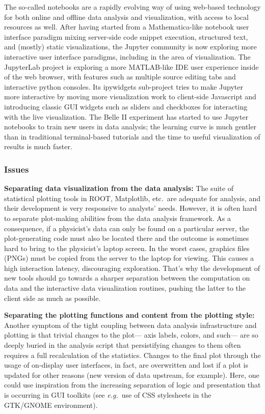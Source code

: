 \documentclass[12pt,a4paper]{article}
\begin{document}
The so-called notebooks are a rapidly evolving way of using web-based technology for both online and offline data analysis and
visualization, with access to local resources as well. After having started from a Mathematica-like notebook user interface
paradigm mixing server-side code snippet execution, structured text, and (mostly) static visualizations, the Jupyter community
is now exploring more interactive user interface paradigms, including in the area of visualization. The JupyterLab project is
exploring a more MATLAB-like IDE user experience inside of the web browser, with features such as multiple source editing tabs
and interactive python consoles. Its ipywidgets sub-project tries to make Jupyter more interactive by moving more visualization
work to client-side Javascript and introducing classic GUI widgets such as sliders and checkboxes for interacting with the live visualization.
The Belle II experiment has started to use Jupyter notebooks to train new users in data analysis; the learning curve is much gentler than in
traditional terminal-based tutorials and the time to useful visualization of results is much faster.


\hypertarget{stats-issues}{%
\subsubsection{Issues}\label{stats-issues}}

{\bf Separating data visualization from the data analysis:}
The suite of statistical plotting tools in ROOT, Matplotlib, etc.\ are adequate for analysis, and their development is
very responsive to analysts’ needs. However, it is often hard to separate plot-making abilities from the data analysis framework.
As a consequence, if a physicist’s data can only be found on a particular server, the plot-generating code must also be located
there and the outcome is sometimes hard to bring to the physicist’s laptop screen. In the worst cases, graphics files (PNGs) must be copied
from the server to the laptop for viewing. This causes a high interaction latency, discouraging exploration. That’s why the
development of new tools should go towards a sharper separation between the computation on data and the interactive data visualization
routines, pushing the latter to the client side as much as possible.

{\bf Separating the plotting functions and content from the plotting style:}
Another symptom of the tight coupling between data analysis infrastructure and plotting is that trivial changes to the plot— axis labels,
colors, and such— are so deeply buried in the analysis script that persistifying changes to them often requires a full recalculation
of the statistics. Changes to the final plot through the usage of on-display user interfaces, in fact, are overwritten and lost if a
plot is updated for other reasons (new version of data upstream, for example). Here, one could use inspiration from the increasing
separation of logic and presentation that is occurring in GUI toolkits (see {\it e.g.}\ use of CSS stylesheets in the GTK/GNOME environment).
\end{document}
